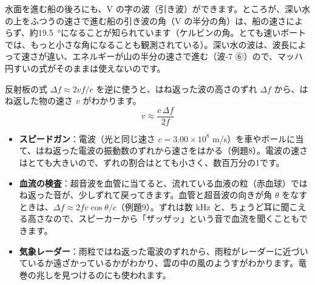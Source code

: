 \begin{seikaku}
水面を進む船の後ろにも、V の字の波（引き波）ができます。ところが、深い水の上をふつうの速さで進む船の引き波の角（V の半分の角）は、船の速さによらず、約\qty{19.5}{\degree}になることが知られています（ケルビンの角。とても速いボートでは、もっと小さな角になることも観測されている）。深い水の波は、波長によって速さが違い、エネルギーが山の半分の速さで進む（波-7 ⑥）ので、マッハ円すいの式がそのままは使えないのです。
\end{seikaku}

\label{ph:波-8:sec7}
反射板の式 $\Delta f\approx2vf/c$ を逆に使うと、はね返った波の高さのずれ $\Delta f$ から、はね返した物の速さ $v$ がわかります。
\[v\approx\frac{c\,\Delta f}{2f}\]
\begin{itemize}[leftmargin=1.2\zw, itemsep=2pt, topsep=2pt, label={\color{bkTheme}●}]
\item \textbf{スピードガン}：電波（光と同じ速さ $c=3.00\times10^8$ m/s）を車やボールに当て、はね返った電波の振動数のずれから速さをはかる（例題8）。電波の速さはとても大きいので、ずれの割合はとても小さく、数百万分の1です。
\item \textbf{血流の検査}：超音波を血管に当てると、流れている血液の粒（赤血球）ではね返った音が、少しずれて戻ってきます。血管と超音波の向きが角 $\theta$ をなすときは、$\Delta f\approx2fv\cos\theta/c$（例題9）。ずれは数 kHz と、ちょうど耳に聞こえる高さなので、スピーカーから「ザッザッ」という音で血流を聞くこともできます。
\item \textbf{気象レーダー}：雨粒ではね返った電波のずれから、雨粒がレーダーに近づいているか遠ざかっているかがわかり、雲の中の風のようすがわかります。竜巻の兆しを見つけるのにも使われます。
\end{itemize}

